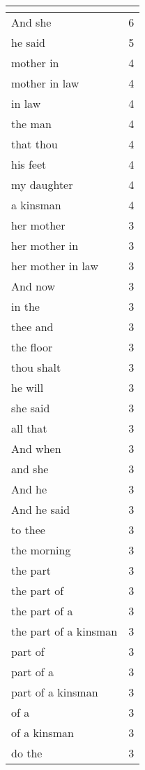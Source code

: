 \begin{center}
\begin{longtable}{|p{3.0in}|p{0.5in}|}
\hline \multicolumn{2}{c}{{ }} \\ \hline
\endfoot 
And she & 6\\ \hline 
he said & 5\\ \hline 
mother in & 4\\ \hline 
mother in law & 4\\ \hline 
in law & 4\\ \hline 
the man & 4\\ \hline 
that thou & 4\\ \hline 
his feet & 4\\ \hline 
my daughter & 4\\ \hline 
a kinsman & 4\\ \hline 
her mother & 3\\ \hline 
her mother in & 3\\ \hline 
her mother in law & 3\\ \hline 
And now & 3\\ \hline 
in the & 3\\ \hline 
thee and & 3\\ \hline 
the floor & 3\\ \hline 
thou shalt & 3\\ \hline 
he will & 3\\ \hline 
she said & 3\\ \hline 
all that & 3\\ \hline 
And when & 3\\ \hline 
and she & 3\\ \hline 
And he & 3\\ \hline 
And he said & 3\\ \hline 
to thee & 3\\ \hline 
the morning & 3\\ \hline 
the part & 3\\ \hline 
the part of & 3\\ \hline 
the part of a & 3\\ \hline 
the part of a kinsman & 3\\ \hline 
part of & 3\\ \hline 
part of a & 3\\ \hline 
part of a kinsman & 3\\ \hline 
of a & 3\\ \hline 
of a kinsman & 3\\ \hline 
do the & 3\\ \hline 
\end{longtable}
\end{center}





